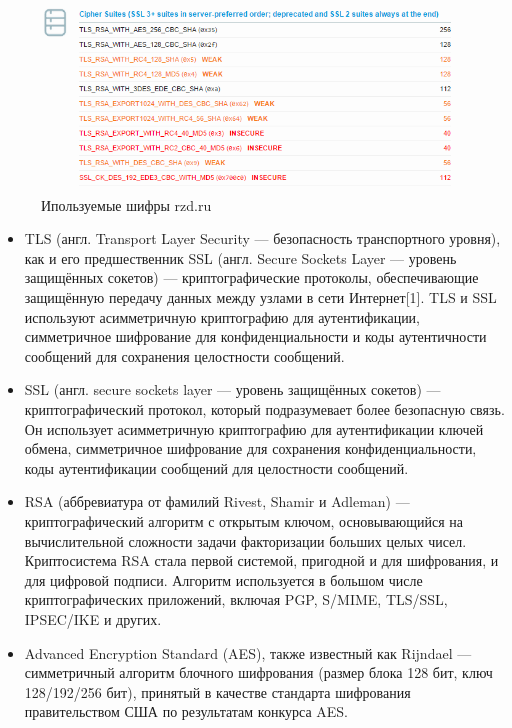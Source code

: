 \documentclass[11pt, a4paper]{article}		%
\begin{document}
\begin{figure}[h!]
\centering
\includegraphics[scale=0.8]{res/cipher_suites_rzd}
\caption{Ипользуемые шифры rzd.ru}
\end{figure}

\begin{itemize}

\item TLS (англ. Transport Layer Security — безопасность транспортного уровня), как и его предшественник SSL (англ. Secure Sockets Layer — уровень защищённых сокетов) — криптографические протоколы, обеспечивающие защищённую передачу данных между узлами в сети Интернет[1]. TLS и SSL используют асимметричную криптографию для аутентификации, симметричное шифрование для конфиденциальности и коды аутентичности сообщений для сохранения целостности сообщений.

\item SSL (англ. secure sockets layer — уровень защищённых сокетов) — криптографический протокол, который подразумевает более безопасную связь. Он использует асимметричную криптографию для аутентификации ключей обмена, симметричное шифрование для сохранения конфиденциальности, коды аутентификации сообщений для целостности сообщений. 

\item RSA (аббревиатура от фамилий Rivest, Shamir и Adleman) — криптографический алгоритм с открытым ключом, основывающийся на вычислительной сложности задачи факторизации больших целых чисел. Криптосистема RSA стала первой системой, пригодной и для шифрования, и для цифровой подписи. Алгоритм используется в большом числе криптографических приложений, включая PGP, S/MIME, TLS/SSL, IPSEC/IKE и других.

\item Advanced Encryption Standard (AES), также известный как Rijndael — симметричный алгоритм блочного шифрования (размер блока 128 бит, ключ 128/192/256 бит), принятый в качестве стандарта шифрования правительством США по результатам конкурса AES. 


\end{itemize}
\end{document}
